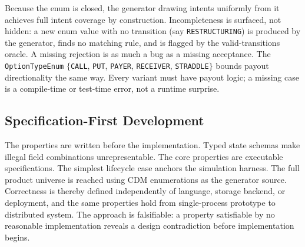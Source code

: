 Because the enum is closed, the generator drawing intents uniformly from it achieves full intent coverage by construction. Incompleteness is surfaced, not hidden: a new enum value with no transition (say \texttt{RESTRUCTURING}) is produced by the generator, finds no matching rule, and is flagged by the valid-transitions oracle. A missing rejection is as much a bug as a missing acceptance. The \texttt{OptionTypeEnum} $\{$\texttt{CALL}, \texttt{PUT}, \texttt{PAYER}, \texttt{RECEIVER}, \texttt{STRADDLE}$\}$ bounds payout directionality the same way. Every variant must have payout logic; a missing case is a compile-time or test-time error, not a runtime surprise.

\subsection{Specification-First Development}
\label{sec:invariants-specfirst}

The properties are written before the implementation. Typed state schemas make illegal field combinations unrepresentable. The core properties are executable specifications. The simplest lifecycle case anchors the simulation harness. The full product universe is reached using CDM enumerations as the generator source. Correctness is thereby defined independently of language, storage backend, or deployment, and the same properties hold from single-process prototype to distributed system. The approach is falsifiable: a property satisfiable by no reasonable implementation reveals a design contradiction before implementation begins.


